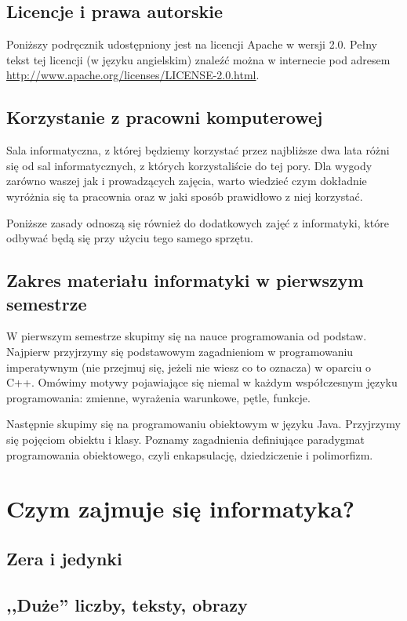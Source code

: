 \documentclass[11pt]{book}
\begin{document}
\section{Licencje i prawa autorskie}
Poniższy podręcznik udostępniony jest na licencji Apache w wersji 2.0.
Pełny tekst tej licencji (w języku angielskim) znaleźć można w internecie
pod adresem \url{http://www.apache.org/licenses/LICENSE-2.0.html}.

\section{Korzystanie z pracowni komputerowej}
Sala informatyczna, z której będziemy korzystać przez najbliższe dwa lata
różni się od sal informatycznych, z których korzystaliście do tej pory.
Dla wygody zarówno waszej jak i prowadzących zajęcia, warto wiedzieć czym
dokładnie wyróżnia się ta pracownia oraz w jaki sposób prawidłowo z niej
korzystać.

Poniższe zasady odnoszą się również do dodatkowych zajęć z informatyki, które
odbywać będą się przy użyciu tego samego sprzętu.

\section{Zakres materiału informatyki w pierwszym semestrze}
W pierwszym semestrze skupimy się na nauce programowania od podstaw. Najpierw 
przyjrzymy się podstawowym zagadnieniom w programowaniu imperatywnym (nie 
przejmuj się, jeżeli nie wiesz co to oznacza) w oparciu o C++. Omówimy motywy
pojawiające się niemal w każdym współczesnym języku programowania: zmienne,
wyrażenia warunkowe, pętle, funkcje.

Następnie skupimy się na programowaniu obiektowym w języku Java. Przyjrzymy
się pojęciom obiektu i klasy. Poznamy zagadnienia definiujące paradygmat
programowania obiektowego, czyli enkapsulację, dziedziczenie i polimorfizm.

\chapter{Czym zajmuje się informatyka?}
\section{Zera i jedynki}
\section{,,Duże'' liczby, teksty, obrazy}
\end{document}
